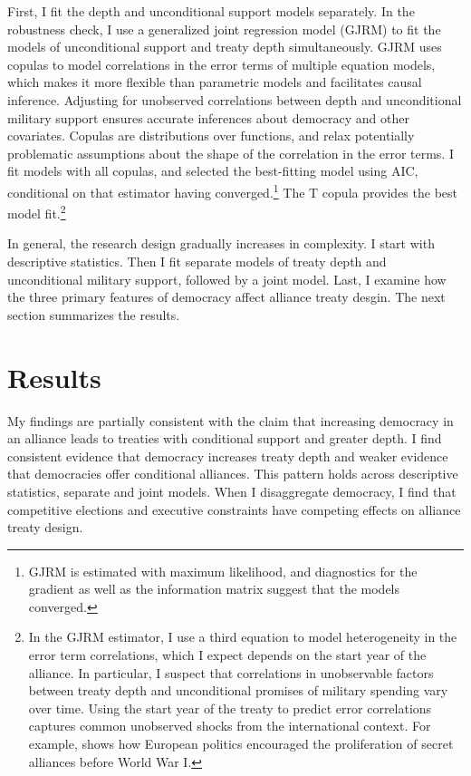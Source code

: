 \documentclass[12pt]{article}
\begin{document}
First, I fit the depth and unconditional support models separately.
In the robustness check, I use a generalized joint regression model (GJRM) \citep{Braumoelleretal2018} to fit the models of unconditional support and treaty depth simultaneously.
GJRM uses copulas to model correlations in the error terms of multiple equation models, which makes it more flexible than parametric models and facilitates causal inference. 
Adjusting for unobserved correlations between depth and unconditional military support ensures accurate inferences about democracy and other covariates. 
Copulas are distributions over functions, and relax potentially problematic assumptions about the shape of the correlation in the error terms. 
I fit models with all copulas, and selected the best-fitting model using AIC, conditional on that estimator having converged.\footnote{GJRM is estimated with maximum likelihood, and diagnostics for the gradient as well as the information matrix suggest that the models converged.} 
The T copula provides the best model fit.\footnote{In the GJRM estimator, I use a third equation to model heterogeneity in the error term correlations, which I expect depends on the start year of the alliance. 
In particular, I suspect that correlations in unobservable factors between treaty depth and unconditional promises of military spending vary over time. 
Using the start year of the treaty to predict error correlations captures common unobserved shocks from the international context. 
For example, \citet{Kuo2019} shows how European politics encouraged the proliferation of secret alliances before World War I.}


In general, the research design gradually increases in complexity. 
I start with descriptive statistics. 
Then I fit separate models of treaty depth and unconditional military support, followed by a joint model. 
Last, I examine how the three primary features of democracy affect alliance treaty desgin. 
The next section summarizes the results. 


\section{Results}


My findings are partially consistent with the claim that increasing democracy in an alliance leads to treaties with conditional support and greater depth. 
I find consistent evidence that democracy increases treaty depth and weaker evidence that democracies offer conditional alliances. 
This pattern holds across descriptive statistics, separate and joint models. 
When I disaggregate democracy, I find that competitive elections and executive constraints have competing effects on alliance treaty design. 
\end{document}
